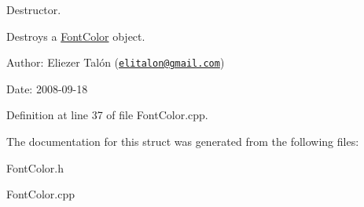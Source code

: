 Destructor. 

Destroys a \hyperlink{struct_font_color}{FontColor} object.

\begin{Desc}
\item[Author:]Eliezer Talón (\href{mailto:elitalon@gmail.com}{\tt elitalon@gmail.com}) \end{Desc}
\begin{Desc}
\item[Date:]2008-09-18 \end{Desc}


Definition at line 37 of file FontColor.cpp.

The documentation for this struct was generated from the following files:\begin{CompactItemize}
\item 
FontColor.h\item 
FontColor.cpp\end{CompactItemize}
